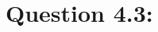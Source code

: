 \documentclass[
]{article}
\newenvironment{Shaded}{\begin{snugshade}}{\end{snugshade}}
\newcommand{\CommentTok}[1]{\textcolor[rgb]{0.56,0.35,0.01}{\textit{#1}}}
\begin{document}
\hypertarget{question-4.3}{%
\section{Question 4.3:}\label{question-4.3}}

\begin{Shaded}
\end{Shaded}
\end{document}
